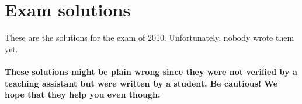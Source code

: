 \documentclass[main]{subfiles}
\begin{document}

\section{Exam solutions}
These are the solutions for the exam of 2010. Unfortunately, nobody wrote them yet.
\\\\
\textbf{These solutions might be plain wrong since they were not verified by a teaching assistant but were written by a student. Be cautious! We hope that they help you even though.}

\end{document}
